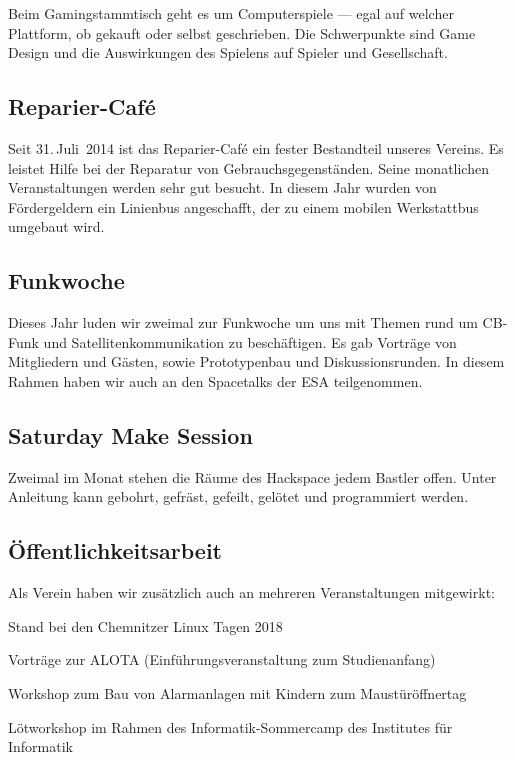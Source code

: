 \documentclass[ngerman]{scrartcl}
\begin{document}
Beim Gamingstammtisch geht es um Computerspiele — egal auf welcher
Plattform, ob gekauft oder selbst geschrieben. Die Schwerpunkte sind
Game Design und die Auswirkungen des Spielens auf Spieler und
Gesellschaft.

\subsection{Reparier-Café}

Seit 31.\,Juli~2014 ist das Reparier-Café ein fester Bestandteil unseres Vereins.
Es leistet Hilfe bei der Reparatur von Gebrauchsgegenständen.
Seine monatlichen Veranstaltungen werden sehr gut besucht. In diesem Jahr wurden
von Fördergeldern ein Linienbus angeschafft, der zu einem mobilen Werkstattbus
umgebaut wird.

\subsection{Funkwoche}

Dieses Jahr luden wir zweimal zur Funkwoche um uns mit Themen rund um CB-Funk und Satellitenkommunikation
zu beschäftigen. Es gab Vorträge von Mitgliedern und Gästen, sowie Prototypenbau und Diskussionsrunden.
In diesem Rahmen haben wir auch an den Spacetalks der ESA teilgenommen.

\subsection{Saturday Make Session}

Zweimal im Monat stehen die Räume des Hackspace jedem Bastler offen. Unter
Anleitung kann gebohrt, gefräst, gefeilt, gelötet und programmiert werden.

\subsection{Öffentlichkeitsarbeit}

Als Verein haben wir zusätzlich auch an mehreren Veranstaltungen mitgewirkt:
\begin{compactitem}
	\item Stand bei den Chemnitzer Linux Tagen 2018
	\item Vorträge zur ALOTA (Einführungsveranstaltung zum Studienanfang)
	\item Workshop zum Bau von Alarmanlagen mit Kindern zum Maustüröffnertag
	\item Lötworkshop im Rahmen des Informatik-Sommercamp des Institutes für Informatik
\end{compactitem}
\end{document}
